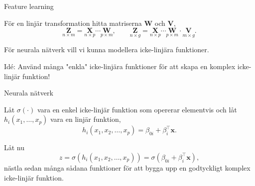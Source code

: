 \documentclass[10pt,english]{beamer}
\begin{document}
\begin{frame}{Feature learning}
    
    För en linjär transformation hitta matriserna $\mathbf{W}$ och $\mathbf{V}$,
    \begin{equation*}
        \underset{n \times m}{\mathbf{Z}} = \underset{n \times p}{\mathbf{X}} \cdots \underset{p \times m}{\mathbf{W}}, \qquad \underset{n \times g}{\mathbf{Z}} = \underset{n \times p}{\mathbf{X}} \cdots \underset{p \times m}{\mathbf{W}} \cdot \underset{m \times g}{\mathbf{V}}.
    \end{equation*}

    För neurala nätverk vill vi kunna modellera icke-linjära funktioner.

    Idé: Använd många "enkla" icke-linjära funktioner för att skapa en komplex icke-linjär funktion!

\end{frame}

\begin{frame}{Neurala nätverk}

    \begin{greenbox}

        Låt $\sigma(\cdot)$ vara en enkel icke-linjär funktion som opererar elementvis och låt $h_i(x_1, \ldots, x_p)$ vara en linjär funktion,
        \begin{equation*}
            h_i(x_1, x_2, \ldots, x_p) = \beta_{0i} + \beta_i^{\top} \mathbf{x}.
        \end{equation*}

        Låt nu
        \begin{equation*}
            z = \sigma(h_i(x_1, x_2, \ldots, x_p)) = \sigma(\beta_{0i} + \beta_i^{\top} \mathbf{x}),
        \end{equation*}
        nästla sedan många sådana funktioner för att bygga upp en godtyckligt komplex icke-linjär funktion.
    \end{greenbox}
    
\end{frame}
\end{document}
